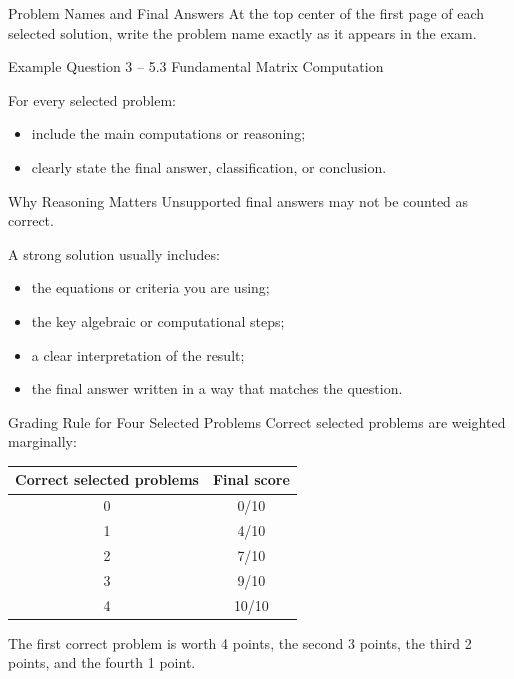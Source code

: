 \documentclass[aspectratio=169]{beamer}
\begin{document}
\begin{frame}{Problem Names and Final Answers}
  At the top center of the first page of each selected solution, write the problem name exactly as it appears in the exam.

  \vspace{0.5cm}

  \begin{exampleblock}{Example}
    \centering
    Question 3 -- 5.3 Fundamental Matrix Computation
  \end{exampleblock}

  \vspace{0.5cm}

  For every selected problem:
  \begin{itemize}
    \item include the main computations or reasoning;
    \item clearly state the final answer, classification, or conclusion.
  \end{itemize}
\end{frame}

\begin{frame}{Why Reasoning Matters}
  Unsupported final answers may not be counted as correct.

  \vspace{0.4cm}

  A strong solution usually includes:
  \begin{itemize}
    \item the equations or criteria you are using;
    \item the key algebraic or computational steps;
    \item a clear interpretation of the result;
    \item the final answer written in a way that matches the question.
  \end{itemize}
\end{frame}

\begin{frame}{Grading Rule for Four Selected Problems}
  Correct selected problems are weighted marginally:

  \vspace{0.3cm}

  \begin{center}
    \begin{tabular}{cc}
      \toprule
      Correct selected problems & Final score \\
      \midrule
      0 & 0/10 \\
      1 & 4/10 \\
      2 & 7/10 \\
      3 & 9/10 \\
      4 & 10/10 \\
      \bottomrule
    \end{tabular}
  \end{center}

  \vspace{0.3cm}

  The first correct problem is worth 4 points, the second 3 points, the third 2 points, and the fourth 1 point.
\end{frame}
\end{document}
